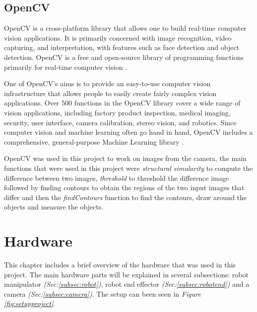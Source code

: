 \subsection{OpenCV}
OpenCV is a cross-platform library that allows one to build real-time computer vision applications. It is primarily concerned with image recognition, video capturing, and interpretation, with features such as face detection and object detection. OpenCV is a free and open-source library of programming functions primarily for real-time computer vision \cite{noauthor_opencv_nodate}.

One of OpenCV's aims is to provide an easy-to-use computer vision infrastructure that allows people to easily create fairly complex vision applications. Over 500 functions in the OpenCV library cover a wide range of vision applications, including factory product inspection, medical imaging, security, user interface, camera calibration, stereo vision, and robotics. Since computer vision and machine learning often go hand in hand, OpenCV includes a comprehensive, general-purpose Machine Learning library \cite{kaehler_what_2016}.


OpenCV was used in this project to work on images from the camera, the main functions that were used in this project were \textit{structural simularity} to compute the difference between two images, \textit{threshold} to threshold the difference image followed by finding contours to obtain the regions of the two input images that differ and then the \textit{findContours} function to find the contours, draw around the objects and measure the objects.

\clearpage
\section{Hardware \label{sec:hardware}}
This chapter includes a brief overview of the hardware that was used in this project. The main hardware parts will be explained in several subsections: robot manipulator \textit{(Sec:\ref{subsec:robot})}, robot end effector \textit{(Sec:\ref{subsec:robotend})} and a camera \textit{(Sec:\ref{subsec:camera})}. The setup can been seen in \textit{Figure \ref{fig:setupproject}}.

